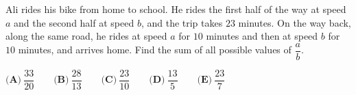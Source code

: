 Ali rides his bike from home to school. He rides the first half of the way at speed $a$ and the second half at speed $b$, and the trip takes $23$ minutes. On the way back, along the same road, he rides at speed $a$ for $10$ minutes and then at speed $b$ for $10$ minutes, and arrives home. Find the sum of all possible values of $\dfrac {a}{b}$.

$\textbf{(A)}\ \dfrac{33}{20}\qquad\textbf{(B)}\ \dfrac{28}{13}\qquad\textbf{(C)}\ \dfrac{23}{10}\qquad\textbf{(D)}\ \dfrac{13}{5}\qquad\textbf{(E)}\ \dfrac{23}{7}$
